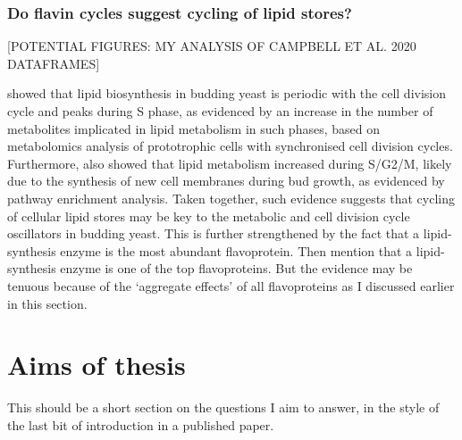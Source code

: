 \subsubsection{Do flavin cycles suggest cycling of lipid stores?}
\label{subsubsec:intro-flavin-ymc-lipid_cycling}

[POTENTIAL FIGURES: MY ANALYSIS OF CAMPBELL ET AL. 2020 DATAFRAMES]

\textcite{campbellBuildingBlocksAre2020} showed that lipid biosynthesis in budding yeast is periodic with the cell division cycle and peaks during S phase, as evidenced by an increase in the number of metabolites implicated in lipid metabolism in such phases, based on metabolomics analysis of prototrophic cells with synchronised cell division cycles.
Furthermore, \textcite{ewaldYeastCyclinDependentKinase2016} also showed that lipid metabolism increased during S/G2/M, likely due to the synthesis of new cell membranes during bud growth, as evidenced by pathway enrichment analysis.
Taken together, such evidence suggests that cycling of cellular lipid stores may be key to the metabolic and cell division cycle oscillators in budding yeast.
This is further strengthened by the fact that a lipid-synthesis enzyme is the most abundant flavoprotein.
Then mention that a lipid-synthesis enzyme is one of the top flavoproteins.
But the evidence may be tenuous because of the `aggregate effects' of all flavoproteins as I discussed earlier in this section.


\section{Aims of thesis} %
\label{sec:intro-end}

This should be a short section on the questions I aim to answer, in the style of the last bit of introduction in a published paper.

